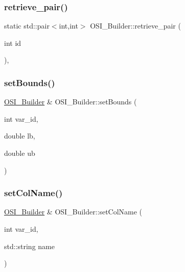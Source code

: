 \mbox{\label{class_o_s_i___builder_aa876adecee1af9bb840d434de1e78980}} 
\subsubsection{\texorpdfstring{retrieve\+\_\+pair()}{retrieve\_pair()}}
{\footnotesize\ttfamily static std\+::pair$<$int,int$>$ O\+S\+I\+\_\+\+Builder\+::retrieve\+\_\+pair (\begin{DoxyParamCaption}\item[{int}]{id }\end{DoxyParamCaption})\hspace{0.3cm}{\ttfamily [inline]}, {\ttfamily [static]}}

\mbox{\label{class_o_s_i___builder_a8def1d148b0bb00d9ac4f454a5497e17}} 
\subsubsection{\texorpdfstring{set\+Bounds()}{setBounds()}}
{\footnotesize\ttfamily \hyperlink{class_o_s_i___builder}{O\+S\+I\+\_\+\+Builder} \& O\+S\+I\+\_\+\+Builder\+::set\+Bounds (\begin{DoxyParamCaption}\item[{int}]{var\+\_\+id,  }\item[{double}]{lb,  }\item[{double}]{ub }\end{DoxyParamCaption})}

\mbox{\label{class_o_s_i___builder_acb409a7ad7615d995af3f1c5e56417e7}} 
\subsubsection{\texorpdfstring{set\+Col\+Name()}{setColName()}}
{\footnotesize\ttfamily \hyperlink{class_o_s_i___builder}{O\+S\+I\+\_\+\+Builder} \& O\+S\+I\+\_\+\+Builder\+::set\+Col\+Name (\begin{DoxyParamCaption}\item[{int}]{var\+\_\+id,  }\item[{std\+::string}]{name }\end{DoxyParamCaption})}

